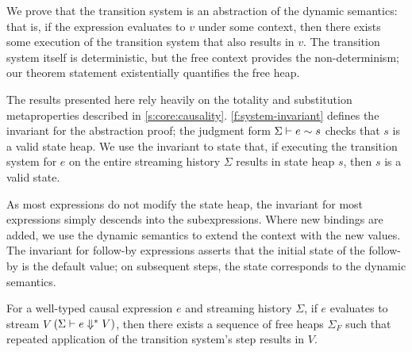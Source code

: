 We prove that the transition system is an abstraction of the dynamic semantics: that is, if the expression evaluates to $v$ under some context, then there exists some execution of the transition system that also results in $v$.
The transition system itself is deterministic, but the free context provides the non-determinism; our theorem  statement existentially quantifies the free heap.



The results presented here rely heavily on the totality and substitution metaproperties described in \autoref{s:core:causality}.
\autoref{f:system-invariant} defines the invariant for the abstraction proof; the judgment form $\Sigma \vdash e \sim s$ checks that $s$ is a valid state heap.
We use the invariant to state that, if executing the transition system for $e$ on the entire streaming history $\Sigma$ results in state heap $s$, then $s$ is a valid state.

As most expressions do not modify the state heap, the invariant for most expressions simply descends into the subexpressions.
Where new bindings are added, we use the dynamic semantics to extend the context with the new values.
The invariant for follow-by expressions asserts that the initial state of the follow-by is the default value; on subsequent steps, the state corresponds to the dynamic semantics.

\begin{theorem}
  For a well-typed causal expression $e$ and streaming history $\Sigma$, if $e$ evaluates to stream $V$ $(\Sigma \vdash e \Downarrow^{*} V)$, then there exists a sequence of free heaps $\Sigma_{F}$ such that repeated application of the transition system's step results in $V$.
\end{theorem}

